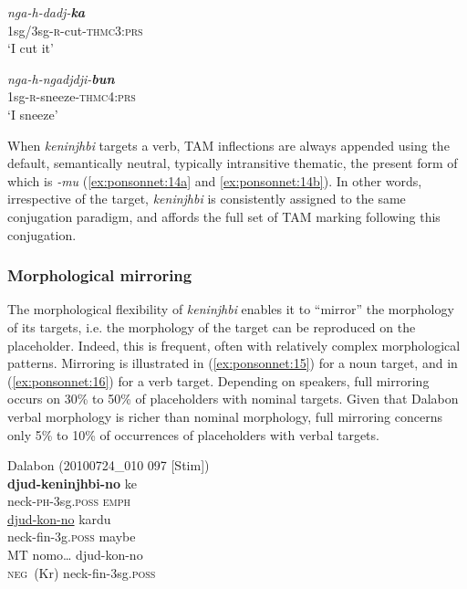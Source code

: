 \documentclass[output=paper]{langscibook}
\begin{document}
\newpage
\ex \label{ex:ponsonnet:14e}
\textit{nga-h-dadj-}\textbf{\textit{ka}}\\
1sg/3sg-\textsc{r}{}-cut-\textsc{thmc3}:\textsc{prs}\\
\glt ‘I cut it’

\ex \label{ex:ponsonnet:14f}
\textit{nga-h-ngadjdji-}\textbf{\textit{bun}}\\
1sg-\textsc{r}{}-sneeze-\textsc{thmc4}:\textsc{prs}\\
\glt ‘I sneeze’\\
\z
\z

When \textit{keninjhbi} targets a verb, TAM inflections are always appended using the default, semantically neutral, typically intransitive thematic, the present form of which is \textit{{}-mu} (\ref{ex:ponsonnet:14a} and \ref{ex:ponsonnet:14b}). In other words, irrespective of the target, \textit{keninjhbi} is consistently assigned to the same conjugation paradigm, and affords the full set of TAM marking following this conjugation. 

\subsubsection{Morphological mirroring}
\label{sec:ponsonnet:3.2.3}
The morphological flexibility of \textit{keninjhbi} enables it to “mirror” the morphology of its targets, i.e. the morphology of the target can be reproduced on the placeholder. Indeed, this is frequent, often with relatively complex morphological patterns. Mirroring is illustrated in (\ref{ex:ponsonnet:15}) for a noun target, and in (\ref{ex:ponsonnet:16}) for a verb target. Depending on speakers, full mirroring occurs on 30\% to 50\% of placeholders with nominal targets. Given that Dalabon verbal morphology is richer than nominal morphology, full mirroring concerns only 5\% to 10\% of occurrences of placeholders with verbal targets.

\ea
\label{ex:ponsonnet:15}Dalabon (20100724\_010 097 [Stim])\\
  \textbf{djud-keninjhbi-no}   ke\\
   {} {neck}\textsc{-ph}-3sg.\textsc{poss} \textsc{emph}\\
   
  \uline{djud-kon-no}     kardu\\
   {} neck-fin-3g.\textsc{poss} maybe\\
   
\gll \textup{MT}  nomo…   djud-kon-no\\
  {} {\textsc{neg}~(Kr)}  neck-fin-3sg.\textsc{poss}\\
  
\end{document}
